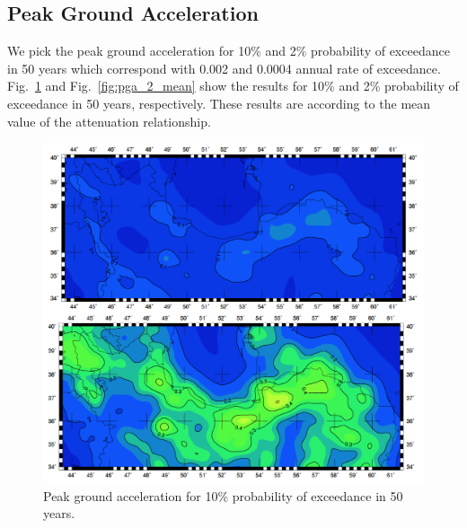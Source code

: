 \subsection{Peak Ground Acceleration}

We pick the peak ground acceleration for 10\% and 2\% probability of exceedance in 50 years which correspond with 0.002 and 0.0004 annual rate of exceedance. Fig.~\ref{fig:pga_10_mean} and Fig.~\ref{fig:pga_2_mean} show the results for 10\% and 2\% probability of exceedance in 50 years, respectively. These results are according to the mean value of the attenuation relationship.

\begin{figure} [!ht]
\centering
\includegraphics[scale=0.3]{figures/pdf/pga_10_mean.pdf} 
\caption{Peak ground acceleration for 10\% probability of exceedance in 50 years.}
\label{fig:pga_10_mean}
\end{figure}

